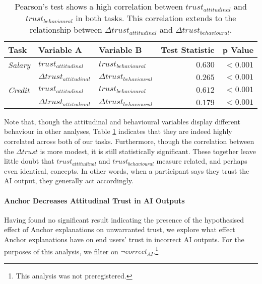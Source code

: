 \begin{table}[htb]
    \centering
    \caption{Pearson's test shows a high correlation between $trust_{attitudinal}$ and $trust_{behavioural}$ in both tasks. This correlation extends to the relationship between $\Delta trust_{attitudinal}$ and $\Delta trust_{behavioural}$.}
    \label{tab:trust-correlation}
    \begin{tabular}{lllrr}
        \toprule
        Task & Variable A & Variable B & Test Statistic & p Value \\
        \midrule
        \emph{Salary} & $trust_{attitudinal}$ & $trust_{behavioural}$ & $\mathbf{0.630}$ & $\mathbf{<0.001}$ \\
        & $\Delta trust_{attitudinal}$ & $\Delta trust_{behavioural}$ & $\mathbf{0.265}$ & $\mathbf{<0.001}$ \\
        \midrule
        \emph{Credit} & $trust_{attitudinal}$ & $trust_{behavioural}$ & $\mathbf{0.612}$ & $\mathbf{<0.001}$ \\
        & $\Delta trust_{attitudinal}$ & $\Delta trust_{behavioural}$ & $\mathbf{0.179}$ & $\mathbf{<0.001}$ \\
        \bottomrule
    \end{tabular}
\end{table}

Note that, though the attitudinal and behavioural variables display different behaviour in other analyses, Table \ref{tab:trust-correlation} indicates that they are indeed highly correlated across both of our tasks. Furthermore, though the correlation between the $\Delta trust$ is more modest, it is still statistically significant. These together leave little doubt that $trust_{attitudinal}$ and $trust_{behavioural}$ measure related, and perhaps even identical, concepts. In other words, when a participant says they trust the AI output, they generally act accordingly.

\paragraph{Anchor Decreases Attitudinal Trust in AI Outputs}\label{sec:anchor-attitudinal}
Having found no significant result indicating the presence of the hypothesised effect of Anchor explanations on unwarranted trust, we explore what effect Anchor explanations have on end users' trust in incorrect AI outputs. For the purposes of this analysis, we filter on $\neg correct_{AI}$.\footnote{This analysis was not preregistered.}


